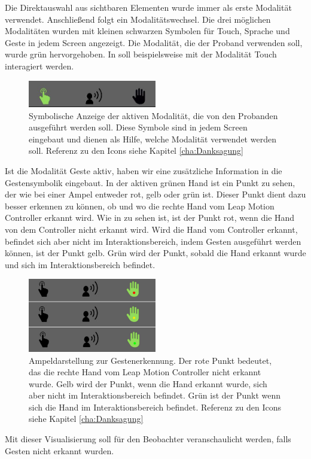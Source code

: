Die Direktauswahl aus sichtbaren Elementen wurde immer als erste Modalität verwendet.
Anschließend folgt ein Modalitätswechsel. 
Die drei möglichen Modalitäten wurden mit kleinen schwarzen Symbolen für Touch, Sprache und Geste in jedem Screen angezeigt. 
Die Modalität, die der Proband verwenden soll, wurde grün hervorgehoben. 
In  soll beispielsweise mit der Modalität Touch interagiert werden. 
\begin{figure}[ht]
  \centering
  \includegraphics[width=0.5\textwidth]{img/ModusAktiv.jpg}
  \caption[Symbolische Anzeige der aktiven Modalität]{Symbolische Anzeige der aktiven Modalität, die von den Probanden ausgeführt werden soll. Diese Symbole sind in jedem Screen eingebaut und dienen als Hilfe, welche Modalität verwendet werden soll.
	Referenz zu den Icons siehe Kapitel \ref{cha:Danksagung}}
  \label{fig:ModusAktiv}
\end{figure}

Ist die Modalität Geste aktiv, haben wir eine zusätzliche Information in die Gestensymbolik eingebaut. 
In der aktiven grünen Hand ist ein Punkt zu sehen, der wie bei einer Ampel entweder rot, gelb oder grün ist. 
Dieser Punkt dient dazu besser erkennen zu können, ob und wo die rechte Hand vom Leap Motion Controller erkannt wird. 
Wie in  zu sehen ist, ist der Punkt rot, wenn die Hand von dem Controller nicht erkannt wird. 
Wird die Hand vom Controller erkannt, befindet sich aber nicht im Interaktionsbereich, indem Gesten ausgeführt werden können, ist der Punkt gelb.
Grün wird der Punkt, sobald die Hand erkannt wurde und sich im Interaktionsbereich befindet.
\begin{figure}[ht]
  \centering
  \includegraphics[width=0.5\textwidth]{img/Gestenerkennung.jpg}
  \caption[Ampeldarstellung zur Gestenerkennung]{Ampeldarstellung zur Gestenerkennung. Der rote Punkt bedeutet, das die rechte Hand vom Leap Motion Controller nicht erkannt wurde. 
	Gelb wird der Punkt, wenn die Hand erkannt wurde, sich aber nicht im Interaktionsbereich befindet. 
	Grün ist der Punkt wenn sich die Hand im Interaktionsbereich befindet. Referenz zu den Icons siehe Kapitel \ref{cha:Danksagung}}
  \label{fig:Ampeldarstellung}
\end{figure} 
Mit dieser Visualisierung soll für den Beobachter veranschaulicht werden, falls Gesten nicht erkannt wurden. 

